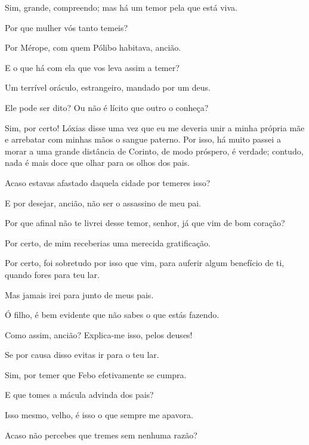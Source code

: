    Sim, grande, compreendo; mas há um temor pela que está viva.

   Por que mulher vós tanto temeis?

   Por Mérope, com quem Pólibo habitava, ancião.

   E o que há com ela que vos leva assim a temer?

   Um terrível oráculo, estrangeiro, mandado por um deus.

   Ele pode ser dito? Ou não é lícito que outro o conheça?

   Sim, por certo! Lóxias disse uma vez que eu me deveria unir a minha
própria mãe e arrebatar com minhas mãos o sangue paterno. Por isso, há
muito passei a morar a uma grande distância de Corinto, de modo
próspero, é verdade; contudo, nada é mais doce que olhar para os olhos
dos pais.

   Acaso estavas afastado daquela cidade por temeres isso?

   E por desejar, ancião, não ser o assassino de meu pai.

   Por que afinal não te livrei desse temor, senhor, já que vim de bom
coração?

   Por certo, de mim receberias uma merecida gratificação.

   Por certo, foi sobretudo por isso que vim, para auferir algum benefício
de ti, quando fores para teu lar.

   Mas jamais irei para junto de meus pais.

   Ó filho, é bem evidente que não sabes o que estás fazendo.

   Como assim, ancião? Explica-me isso, pelos deuses!

   Se por causa disso evitas ir para o teu lar.

   Sim, por temer que Febo efetivamente se cumpra.

   E que tomes a mácula advinda dos pais?

   Isso mesmo, velho, é isso o que sempre me apavora.

   Acaso não percebes que tremes sem nenhuma razão?


